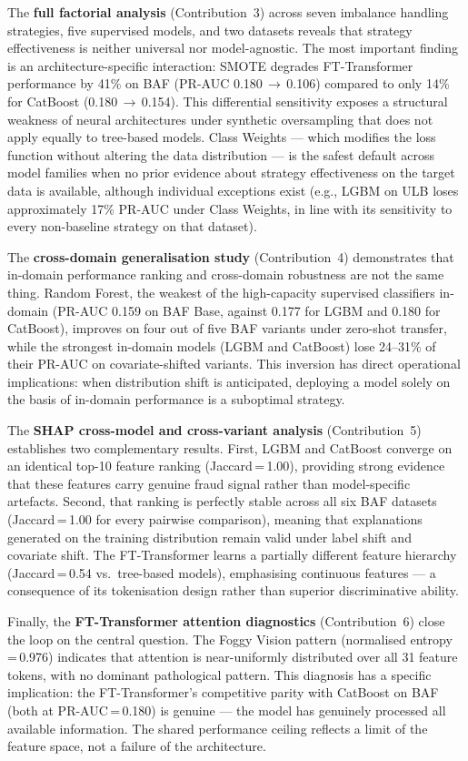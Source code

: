 The \textbf{full factorial analysis} (Contribution~3) across seven imbalance handling strategies, five supervised models, and two datasets reveals that strategy effectiveness is neither universal nor model-agnostic. The most important finding is an architecture-specific interaction: SMOTE degrades FT-Transformer performance by 41\% on BAF (PR-AUC 0.180\,$\to$\,0.106) compared to only 14\% for CatBoost (0.180\,$\to$\,0.154). This differential sensitivity exposes a structural weakness of neural architectures under synthetic oversampling that does not apply equally to tree-based models. Class Weights — which modifies the loss function without altering the data distribution — is the safest default across model families when no prior evidence about strategy effectiveness on the target data is available, although individual exceptions exist (e.g., LGBM on ULB loses approximately 17\% PR-AUC under Class Weights, in line with its sensitivity to every non-baseline strategy on that dataset).

The \textbf{cross-domain generalisation study} (Contribution~4) demonstrates that in-domain performance ranking and cross-domain robustness are not the same thing. Random Forest, the weakest of the high-capacity supervised classifiers in-domain (PR-AUC 0.159 on BAF Base, against 0.177 for LGBM and 0.180 for CatBoost), improves on four out of five BAF variants under zero-shot transfer, while the strongest in-domain models (LGBM and CatBoost) lose 24--31\% of their PR-AUC on covariate-shifted variants. This inversion has direct operational implications: when distribution shift is anticipated, deploying a model solely on the basis of in-domain performance is a suboptimal strategy.

The \textbf{SHAP cross-model and cross-variant analysis} (Contribution~5) establishes two complementary results. First, LGBM and CatBoost converge on an identical top-10 feature ranking (Jaccard\,=\,1.00), providing strong evidence that these features carry genuine fraud signal rather than model-specific artefacts. Second, that ranking is perfectly stable across all six BAF datasets (Jaccard\,=\,1.00 for every pairwise comparison), meaning that explanations generated on the training distribution remain valid under label shift and covariate shift. The FT-Transformer learns a partially different feature hierarchy (Jaccard\,=\,0.54 vs.\ tree-based models), emphasising continuous features — a consequence of its tokenisation design rather than superior discriminative ability.

Finally, the \textbf{FT-Transformer attention diagnostics} (Contribution~6) close the loop on the central question. The Foggy Vision pattern (normalised entropy\,=\,0.976) indicates that attention is near-uniformly distributed over all 31 feature tokens, with no dominant pathological pattern. This diagnosis has a specific implication: the FT-Transformer's competitive parity with CatBoost on BAF (both at PR-AUC\,=\,0.180) is genuine — the model has genuinely processed all available information. The shared performance ceiling reflects a limit of the feature space, not a failure of the architecture.

